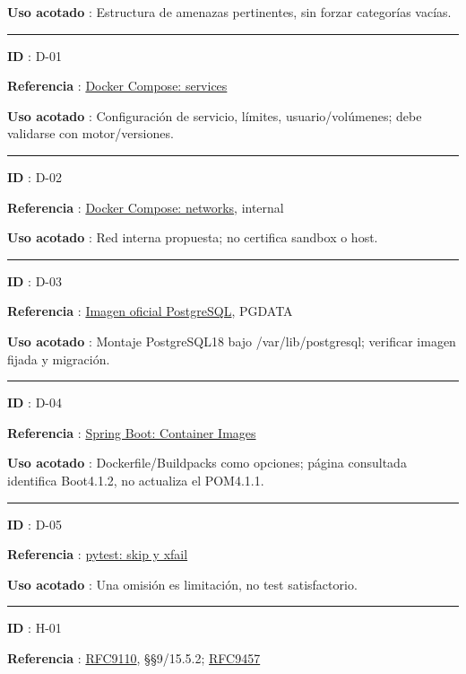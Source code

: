 \documentclass[12pt,a4paper]{report}
\begin{document}
\textbf{Uso acotado }: Estructura de amenazas pertinentes, sin forzar
categorías vacías.

\medskip\hrule\medskip

\textbf{ID }: D-01

\textbf{Referencia
}: \href{https://docs.docker.com/reference/compose-file/services/}{Docker
Compose: services}

\textbf{Uso acotado }: Configuración de servicio, límites,
usuario/volúmenes; debe validarse con motor/versiones.

\medskip\hrule\medskip

\textbf{ID }: D-02

\textbf{Referencia
}: \href{https://docs.docker.com/reference/compose-file/networks/}{Docker
Compose: networks}, internal

\textbf{Uso acotado }: Red interna propuesta; no certifica sandbox o
host.

\medskip\hrule\medskip

\textbf{ID }: D-03

\textbf{Referencia
}: \href{https://raw.githubusercontent.com/docker-library/docs/master/postgres/README.md}{Imagen
oficial PostgreSQL}, PGDATA

\textbf{Uso acotado }: Montaje PostgreSQL18 bajo /var/lib/postgresql;
verificar imagen fijada y migración.

\medskip\hrule\medskip

\textbf{ID }: D-04

\textbf{Referencia
}: \href{https://docs.spring.io/spring-boot/reference/packaging/container-images/index.html}{Spring
Boot: Container Images}

\textbf{Uso acotado }: Dockerfile/Buildpacks como opciones; página
consultada identifica Boot4.1.2, no actualiza el POM4.1.1.

\medskip\hrule\medskip

\textbf{ID }: D-05

\textbf{Referencia
}: \href{https://docs.pytest.org/en/stable/how-to/skipping.html}{pytest:
skip y xfail}

\textbf{Uso acotado }: Una omisión es limitación, no test satisfactorio.

\medskip\hrule\medskip

\textbf{ID }: H-01

\textbf{Referencia
}: \href{https://www.rfc-editor.org/rfc/rfc9110.html}{RFC9110},
§§9/15.5.2; \href{https://www.rfc-editor.org/rfc/rfc9457.html}{RFC9457}
\end{document}

